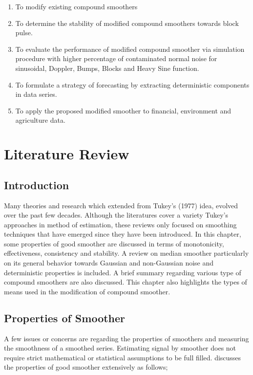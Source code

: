 \documentclass[12pt, a4paper]{report}
\begin{document}
\begin{enumerate}
\item To modify existing compound smoothers 
\item To determine the stability of modified compound smoothers towards block pulse.
\item To evaluate the performance of modified compound smoother via simulation procedure with higher percentage of contaminated normal noise for sinusoidal, Doppler, Bumps, Blocks and Heavy Sine function.  
\item To formulate a strategy of forecasting by extracting deterministic components in data series.
\item To apply the proposed modified smoother to financial, environment and agriculture data. 
\end{enumerate}

\chapter{Literature Review}

\section{Introduction}
Many theories and research which extended from Tukey's (1977) idea, evolved over the past few decades. Although the literatures cover a variety Tukey's approaches in method of estimation, these reviews only focused on smoothing techniques that have emerged since they have been introduced. In this chapter, some properties of good smoother are discussed in terms of monotonicity,  effectiveness, consistency and stability. A review on median smoother particularly on its general behavior towards Gaussian and non-Gaussian noise and deterministic properties is included. A brief summary regarding various type of compound smoothers are also discussed. This chapter also highlights the types of means used in the modification of compound smoother. 

\section{Properties of Smoother}

A few issues or concerns are regarding the properties of smoothers and measuring the smoothness of a smoothed series. Estimating signal by smoother does not require strict mathematical or statistical assumptions to be full filled. \cite{jankowitz2007} discusses the properties of good smoother extensively as follows;
\end{document}
